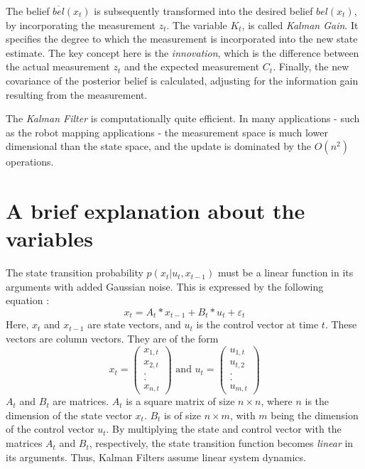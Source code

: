 \documentclass[a4paper,12pt]{extarticle}
\theoremstyle{mytheor}
\begin{document}
The belief $\overline{bel}(x_t)$ is subsequently transformed into the desired belief $bel(x_t)$, by incorporating the measurement $z_t$. The variable $K_t$, is called \emph{Kalman Gain}. It specifies the degree to which the measurement is incorporated into the new state estimate. The key concept here is the \emph{innovation}, which is the difference between the actual measurement $z_t$ and the expected measurement $C_t$. Finally, the new covariance of the posterior belief is calculated, adjusting for the information gain resulting from the measurement.


The \emph{Kalman Filter} is computationally quite efficient. In many applications - such as the robot mapping applications - the measurement space is much lower dimensional than the state space, and the update is dominated by the $O(n^2)$ operations.


\section*{ A brief explanation about the variables }

The state transition probability $ p( x_t | u_t, x_{t-1} ) $ must be a linear function in its arguments with added Gaussian noise. This is expressed by the following equation : 
\begin{equation} \label{eq1}
x_t =  A_t * x_{t-1}  +  B_t * u_t  +  \varepsilon_t
\end{equation}
Here, $x_t$ and $x_{t-1}$ are state vectors, and $u_t$ is the control vector at time $t$. These vectors are column vectors. They are of the form
\begin{equation}
x_t = \left( \begin{array}{c} x_{1,t} \\ x_{2,t} \\ . \\ . \\  x_{n,t} \end{array} \right)
\mbox{~and~}
u_t = \left( \begin{array}{c} u_{1,t} \\ u_{t,2} \\ . \\ . \\ u_{m,t} \end{array} \right)
\end{equation}
$A_t$ and $B_t$ are matrices. $A_t$ is a square matrix of size $ n \times n $, where $n$ is the dimension of the state vector $x_t$. $B_t$ is of size $ n \times m$, with $m$ being the dimension of the control vector $u_t$. By multiplying the state and control vector with the matrices $A_t$ and $B_t$, respectively, the state transition function becomes \emph{linear} in its arguments. Thus, Kalman Filters assume linear system dynamics.
\end{document}
